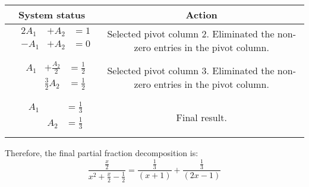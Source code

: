 {\begin{longtable}{cc} System status&Action \\\hline $\begin{array}{llll} & 2A_{1} & +A_{2} & =1\\ & -A_{1} & +A_{2} & =0\\\end{array}$ & Selected pivot column 2. Eliminated the non-zero entries in the pivot column. \\\hline $\begin{array}{llll} & A_{1} & +\frac{A_{2} }{2} & =\frac{1}{2}\\ & & \frac{3}{2}A_{2} & =\frac{1}{2}\\\end{array}$& Selected pivot column 3. Eliminated the non-zero entries in the pivot column. \\\hline $\begin{array}{llll} & A_{1} & & =\frac{1}{3}\\ & & A_{2} & =\frac{1}{3}\\\end{array}$& Final result.\\ \end{longtable}
Therefore, the final partial fraction decomposition is: \[\frac{\frac{x }{2}}{x^{2}+\frac{x }{2} -\frac{1}{2} } =\frac{ \frac{ 1}{3}}{(x +1)}+ \frac{\frac{1}{3}}{(2x -1)}\]
}

